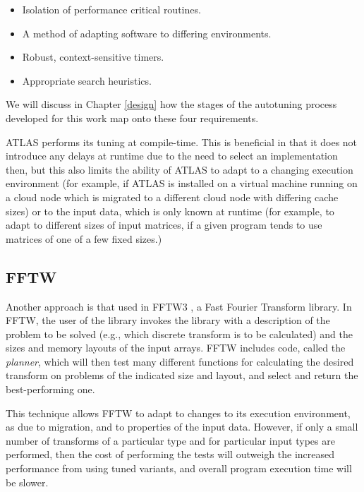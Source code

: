 \documentclass[msthesis,justified,copyright,final,numbers,sort&compress,
gsmodern,amstex,natbib]{uothesis}
\begin{document}
\begin{itemize}
\item Isolation of performance critical routines.
\item A method of adapting software to differing environments.
\item Robust, context-sensitive timers.
\item Appropriate search heuristics.
\end{itemize}

We will discuss in Chapter \ref{design} how the stages of the autotuning process developed for this work map onto these four requirements.

ATLAS performs its tuning at compile-time. This is beneficial in that it does not introduce any delays at runtime due to the need to select an implementation then, but this also limits the ability of ATLAS to adapt to a changing execution environment (for example, if ATLAS is installed on a virtual machine running on a cloud node which is migrated to a different cloud node with differing cache sizes) or to the input data, which is only known at runtime (for example, to adapt to different sizes of input matrices, if a given program tends to use matrices of one of a few fixed sizes.)

\subsection{FFTW}

Another approach is that used in FFTW3 \cite{fftw}, a Fast Fourier Transform library. In FFTW, the user of the library invokes the library with a description of the problem to be solved (e.g., which discrete transform is to be calculated) and the sizes and memory layouts of the input arrays. FFTW includes code, called the \emph{planner}, which will then test many different functions for calculating the desired transform on problems of the indicated size and layout, and select and return the best-performing one.

This technique allows FFTW to adapt to changes to its execution environment, as due to migration, and to properties of the input data. However, if only a small number of transforms of a particular type and for particular input types are performed, then the cost of performing the tests will outweigh the increased performance from using tuned variants, and overall program execution time will be slower.


 
\end{document}
